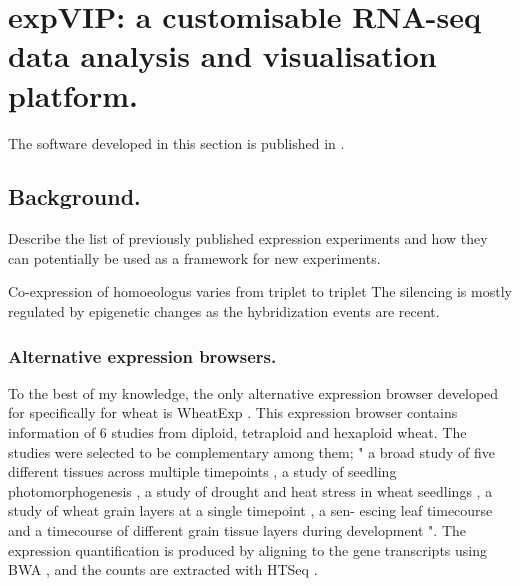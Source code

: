 
\chapter[expVIP]{expVIP: a customisable RNA-seq data analysis and visualisation platform.}
\label{cha:exp}



The software developed in this section is published in \citep{Borrill2016}. 

\section{Background.}



Describe the list of previously published expression experiments and how they can potentially be used as a framework for new experiments.  

Co-expression of homoeologus varies from triplet to triplet \citep{Pfeifer2014}
The silencing is mostly regulated by epigenetic changes as the hybridization events are recent.  \citep{Bottley2006}





\subsection{Alternative expression browsers.}
\label{exp:alternative}

To the best of my knowledge, the only alternative expression browser developed for specifically for wheat is WheatExp \citep{Pearce2015b}. 
This expression browser contains information of 6 studies from diploid, tetraploid and hexaploid wheat. 
The studies were selected to be complementary among them; " a broad study of five different tissues across multiple timepoints \citep{Choulet2014}, a study of seedling photomorphogenesis \citep{Fox2014}, a study of drought and heat stress in wheat seedlings \citep{Liu2015}, a study of wheat grain layers at a single timepoint \citep{Pearce2015}, a sen- escing leaf timecourse \citep{Pearce2014} and a timecourse of different grain tissue layers during development \citep{Pfeifer2014}".
The expression quantification is produced by aligning to the gene transcripts using BWA \citep{Li2010}, and the counts are extracted with HTSeq \citep{Anders2015}. 

